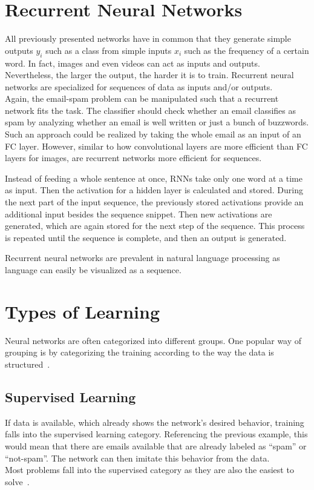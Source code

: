 \section{Recurrent Neural Networks}
All previously presented networks have in common that they generate simple outputs $y_i$ such as a class from simple inputs $x_i$ such as the frequency of a certain word.
In fact, images and even videos can act as inputs and outputs.
Nevertheless, the larger the output, the harder it is to train.
Recurrent neural networks are specialized for sequences of data as inputs and/or outputs.\\
Again, the email-spam problem can be manipulated such that a recurrent network fits the task.
The classifier should check whether an email classifies as spam by analyzing whether an email is well written or just a bunch of buzzwords.
Such an approach could be realized by taking the whole email as an input of an FC layer.
However, similar to how convolutional layers are more efficient than FC layers for images, are recurrent networks more efficient for sequences.

Instead of feeding a whole sentence at once, RNNs take only one word at a time as input.
Then the activation for a hidden layer is calculated and stored.
During the next part of the input sequence, the previously stored activations provide an additional input besides the sequence snippet.
Then new activations are generated, which are again stored for the next step of the sequence.
This process is repeated until the sequence is complete, and then an output is generated.

Recurrent neural networks are prevalent in natural language processing as language can easily be visualized as a sequence.

\section{Types of Learning}
Neural networks are often categorized into different groups.
One popular way of grouping is by categorizing the training according to the way the data is structured~\cite{grosse, ommer}.

\subsection{Supervised Learning}
If data is available, which already shows the network's desired behavior, training falls into the supervised learning category.
Referencing the previous example, this would mean that there are emails available that are already labeled as ``spam'' or ``not-spam''.
The network can then imitate this behavior from the data. \\
Most problems fall into the supervised category as they are also the easiest to solve~\cite{grosse}.

